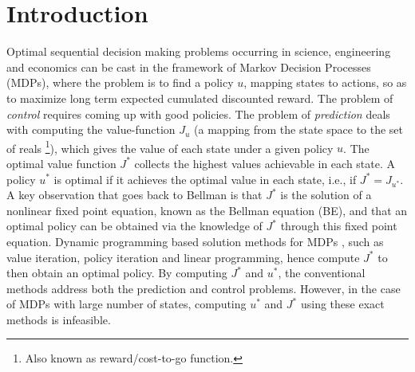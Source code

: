 \section{Introduction}\label{intro}
Optimal sequential decision making problems occurring in science, engineering and economics can be cast in the framework of Markov Decision Processes (MDPs), where the problem is to find a policy $u$, mapping states to actions, so as to maximize long term expected cumulated discounted reward. 
The problem of \emph{control} requires coming up with good policies.
The problem of \emph{prediction} deals with computing the value-function $J_u$ 
	(a mapping from the state space to the set of reals%
	\footnote{Also known as reward/cost-to-go function.}), 
	which gives the value of each state under a given policy $u$. 
The optimal value function $J^*$ collects the highest values achievable in each state.
A policy $u^*$ is optimal if it achieves the optimal value in each state, i.e., if $J^* = J_{u^*}$.
A key observation that goes back to Bellman is that $J^*$ is the solution of a nonlinear fixed point equation,
	known as the Bellman equation (BE),
	and that an optimal policy can be obtained via the knowledge of $J^*$ through this fixed point equation.
Dynamic programming based solution methods for MDPs \cite{BertB},
	such as value iteration, policy iteration and linear programming,
	hence compute $J^*$ to then obtain an optimal policy.
By computing $J^*$ and $u^*$, the conventional methods address both the prediction and control problems. 
However, in the case of MDPs with large number of states, computing $u^*$ and $J^*$ using 
	these exact methods is infeasible. 


